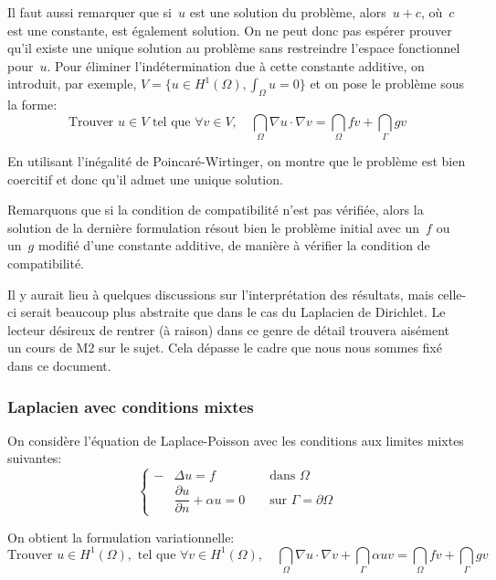 \medskip
Il faut aussi remarquer que si~$u$ est une solution du problème, alors~$u+c$, où~$c$ est une constante, est également solution. On ne peut donc pas espérer prouver qu'il existe une unique solution au problème sans restreindre l'espace fonctionnel pour~$u$.
Pour éliminer l'indétermination due à cette constante additive, on introduit, par exemple, $V = \{u\in H^1(\Omega), \int_\Omega u=0\}$ et on pose le problème sous la forme:
\begin{equation}
\text{Trouver } u \in V \text{ tel que }
\forall v\in V,\quad \dint_\Omega \nabla u\cdot\nabla v = \dint_\Omega fv + \dint_\Gamma gv
\end{equation}

En utilisant l'inégalité de Poincaré-Wirtinger, on montre que le problème est bien coercitif et donc qu'il admet une unique solution.

\medskip
Remarquons que si la condition de compatibilité n'est pas vérifiée, alors la solution de la dernière formulation résout bien le problème initial avec un~$f$ ou un~$g$ modifié d'une constante additive, de manière à vérifier la condition de compatibilité.

\medskip
Il y aurait lieu à quelques discussions sur l'interprétation des résultats, mais celle-ci serait beaucoup plus abstraite que dans le cas du Laplacien de Dirichlet. Le lecteur désireux de rentrer (à raison) dans ce genre de détail trouvera aisément un cours de M2 sur le sujet. Cela dépasse le cadre que nous nous sommes fixé dans ce document.

\medskip
\subsubsection{Laplacien avec conditions mixtes}
On considère l'équation de Laplace-Poisson avec les conditions aux limites mixtes suivantes:
\begin{equation}\left\{\begin{aligned}
-&\Delta u=f &&\text{ dans } \Omega\\
&\dfrac{\partial u}{\partial n}+\alpha u=0 &&\text{ sur } \Gamma=\partial\Omega
\end{aligned}
\right.
\end{equation}

\medskip
On obtient la formulation variationnelle:
\begin{equation}
\text{Trouver } u \in H^1(\Omega), \text{ tel que }
\forall v\in H^1(\Omega),\quad \dint_\Omega \nabla u\cdot\nabla v +\dint_\Gamma \alpha u v = \dint_\Omega fv + \dint_\Gamma gv
\end{equation}


